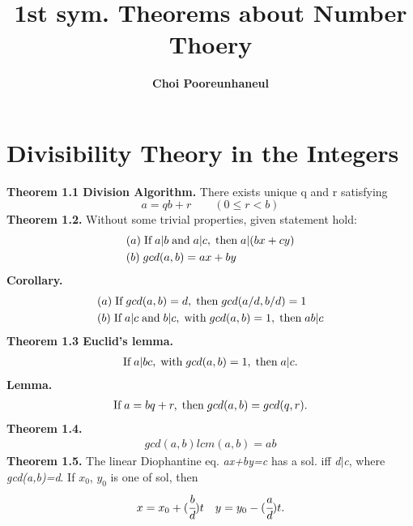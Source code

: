 \documentclass[a4paper,10pt]{article}
\author{\textbf{Choi Pooreunhaneul}}
\title{\textbf{1st sym. Theorems about Number Thoery}}
\begin{document}
\maketitle

\section{Divisibility Theory in the Integers}
\textbf{Theorem 1.1 Division Algorithm.} There exists unique q and r satisfying
\begin{equation}
a=qb+r \qquad (0\leq r<b)
\end{equation}
\textbf{Theorem 1.2.} Without some trivial properties, given statement hold:
\begin{align}
& (a) \; \textnormal{If} \; a|b \; \textnormal{and} \; a|c, \; \textnormal{then} \; a|(bx+cy) \\
& (b) \; gcd(a,b)=ax+by
\end{align}
\textbf{Corollary.} 
\begin{align}
& (a) \; \textnormal{If} \; gcd(a,b)=d, \; \textnormal{then} \; gcd(a/d,b/d)=1
\\ & (b) \; \textnormal{If} \; a|c \; \textnormal{and} \; b|c, \; \textnormal{with} \; gcd(a,b)=1, \; \textnormal{then} \; ab|c
\end{align}
\textbf{Theorem 1.3 Euclid's lemma.}
\begin{align}
\textnormal{If} \; a|bc, \; \textnormal{with} \; gcd(a,b)=1, \; \textnormal{then} \; a|c.
\end{align}
\textbf{Lemma.}
\begin{align}
\textnormal{If} \; a=bq+r, \; \textnormal{then} \; gcd(a,b)=gcd(q,r).
\end{align}
\textbf{Theorem 1.4.}
\begin{align}
gcd(a,b)lcm(a,b)=ab
\end{align}
\textbf{Theorem 1.5.}  The linear Diophantine eq. \textit{ax+by=c} has a sol. iff \textit{d$\mid$c}, where \textit{gcd(a,b)=d}. If \textit{$x_{0}$}, \textit{$y_{0}$} is one of sol, then 
\begin{align}
x=x_0+(\cfrac{b}{d})t \quad y=y_0-(\cfrac{a}{d})t.
\end{align}


\newpage
\end{document}
